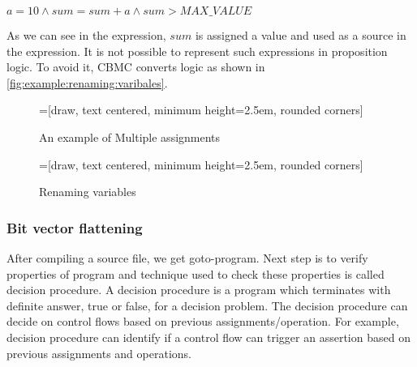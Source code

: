 $ a = 10 \wedge sum = sum + a \wedge sum > MAX\_VALUE$

As we can see in the expression, $sum$ is assigned a value and used as a source in the expression. It is not possible to represent such expressions in proposition logic. To avoid it, CBMC converts logic as shown in \autoref{fig:example:renaming:varibales}.

\begin{figure}[htbp]
    \centering
    =[draw, text centered, minimum height=2.5em, rounded corners]

   \caption{An example of Multiple assignments}
   \label{fig:example:multiple:assignments}
\end{figure}



\begin{figure}[htbp]
    \centering
    =[draw, text centered, minimum height=2.5em, rounded corners]

   \caption{Renaming variables}
   \label{fig:example:renaming:varibales}
\end{figure}


\subsubsection{Bit vector flattening}
After compiling a source file, we get goto-program. Next step is to verify properties of program and technique used to check these properties is called decision procedure. A decision procedure is a program which terminates with definite answer, true or false, for a decision problem. The decision procedure can decide on control flows based on previous assignments/operation. For example, decision procedure can identify if a control flow can trigger an assertion based on previous assignments and operations. 

